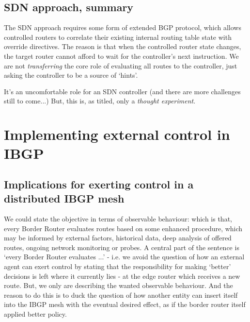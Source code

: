 \subsection{SDN approach, summary}

The SDN approach requires some form of extended BGP protocol, which allows controlled routers to correlate their existing internal routing table state with override directives.  The reason is that when the controlled router state changes, the target router cannot afford to wait for the controller's next instruction.  We are not \textit{transferring} the core role of evaluating all routes to the controller, just asking the controller to be a source of `hints'.

It's an uncomfortable role for an SDN controller (and there are more challenges still to come...)
\bigskip
But, this is, as titled, only a \textit{thought experiment}.

\section{Implementing external control in IBGP}
\subsection{Implications for exerting control in a distributed IBGP mesh}
We could state the objective in terms of observable behaviour: which is that,
every Border Router evaluates routes based on some enhanced procedure, which
may be informed by external factors, historical data, deep analysis of offered
routes, ongoing network monitoring or probes.
A central part of the sentence is `every Border Router evaluates ...' - i.e. we
avoid the question of how an external agent can exert control by stating that
the responsibility for making `better' decisions is left where it currently
lies - at the edge router which receives a new route.
But, we only are describing the wanted observable behaviour.  And the reason to
do this is to duck the question of how another entity can insert itself into
the
IBGP mesh with the eventual desired effect, as if the border router itself
applied better policy.
